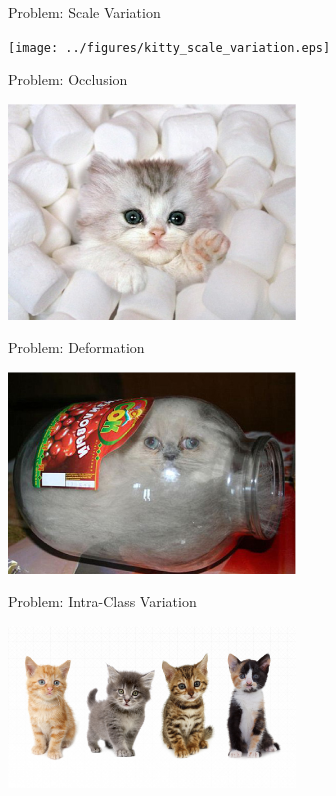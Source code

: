 \documentclass{beamer}
\begin{document}
  \begin{frame}{Problem: Scale Variation}
    \begin{center}
      \texttt{[image: ../figures/kitty\_scale\_variation.eps]}
    \end{center}
  \end{frame}

  \begin{frame}{Problem: Occlusion}
    \begin{center}
      \includegraphics[width=3in]{../figures/kitty_occlusion.eps}
    \end{center}
  \end{frame}

  \begin{frame}{Problem: Deformation}
    \begin{center}
      \includegraphics[width=3in]{../figures/cat_deformed.eps}
    \end{center}
  \end{frame}

  \begin{frame}{Problem: Intra-Class Variation}
    \begin{center}
      \includegraphics[width=3in]{../figures/kitty_intra_class_variation.eps}
    \end{center}
  \end{frame}
\end{document}
